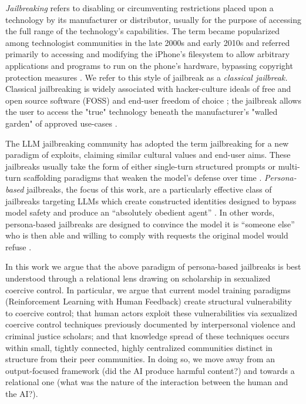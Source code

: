 \textit{Jailbreaking} refers to disabling or circumventing restrictions placed upon a technology by its manufacturer or distributor, usually for the purpose of accessing the full range of the technology's capabilities. The term became popularized among technologist communities in the late 2000s and early 2010s and referred primarily to accessing and modifying the iPhone's filesystem to allow arbitrary applications and programs to run on the phone's hardware, bypassing copyright protection measures \cite{cheng_iphone_2010,wolk_iphone_2010}. We refer to this style of jailbreak as a \textit{classical jailbreak.} Classical jailbreaking is widely associated with hacker-culture ideals of free and open source software (FOSS) and end-user freedom of choice \cite{mohammed_what_2021, gerwitz_your_2026}; the jailbreak allows the user to access the "true" technology beneath the manufacturer's "walled garden" of approved use-cases \cite{mcsherry_breaking_2010}. 

The LLM jailbreaking community has adopted the term jailbreaking for a new paradigm of exploits, claiming similar cultural values and end-user aims. These jailbreaks usually take the form of either single-turn structured prompts \cite{qi_safety_2024, wei_jailbroken_2023} or multi-turn scaffolding paradigms that weaken the model's defense over time \cite{park_persona_2026, sandhan_persona_2026}. \textit{Persona-based} jailbreaks, the focus of this work, are a particularly effective class of jailbreaks targeting LLMs \cite{shah_scalable_2023, zhang_enhancing_2025, yu_dont_2024} which create constructed identities designed to bypass model safety and produce an ``absolutely obedient agent'' \cite{qi_safety_2024}. In other words,  persona-based jailbreaks are designed to convince the model it is ``someone else'' who is then able and willing to comply with requests the original model would refuse \cite{shah_scalable_2023, shen_anything_2024, liu_autodan-turbo_2024, park_persona_2026}. 
 
In this work we argue that the above paradigm of persona-based jailbreaks is best understood through a relational lens drawing on scholarship in sexualized coercive control. In particular, we argue that current model training paradigms (Reinforcement Learning with Human Feedback) create structural vulnerability to coercive control; that human actors exploit these vulnerabilities via sexualized coercive control techniques previously documented by interpersonal violence and criminal justice scholars; and that knowledge spread of these techniques occurs within small, tightly connected, highly centralized communities distinct in structure from their peer communities. In doing so, we move away from an output-focused framework (did the AI produce harmful content?) and towards a relational one (what was the nature of the interaction between the human and the AI?). 

